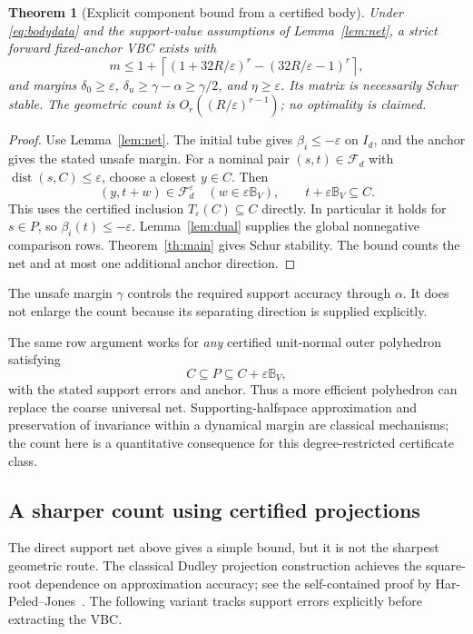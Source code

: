\documentclass[journal,10pt]{IEEEtran}
\newtheorem{theorem}{Theorem}
\theoremstyle{definition}\newtheorem{definition}{Definition}
\theoremstyle{remark}
\newcommand{\dist}{\operatorname{dist}}
\newcommand{\ball}{\mathbb B_V}
\newcommand{\F}{\mathcal F_d}
\begin{document}
\begin{theorem}[Explicit component bound from a certified body]\label{th:count}
Under \eqref{eq:bodydata} and the support-value assumptions of Lemma~\ref{lem:net}, a strict forward fixed-anchor VBC exists with
\begin{equation}\label{eq:mcount}
 m\leq 1+\left\lceil
 (1+32R/\varepsilon)^r-(32R/\varepsilon-1)^r
 \right\rceil,
\end{equation}
and margins $\delta_0\geq\varepsilon$, $\delta_u\geq\gamma-\alpha\geq\gamma/2$, and $\eta\geq\varepsilon$. Its matrix is necessarily Schur stable. The geometric count is $O_r((R/\varepsilon)^{r-1})$; no optimality is claimed.
\end{theorem}
\begin{proof}
Use Lemma~\ref{lem:net}. The initial tube gives $\beta_i\leq-\varepsilon$ on $I_d$, and the anchor gives the stated unsafe margin. For a nominal pair $(s,t)\in\F$ with $\dist(s,C)\leq\varepsilon$, choose a closest $y\in C$. Then
\[
 (y,t+w)\in\mathcal F_d^\varepsilon\quad(w\in\varepsilon\ball),
 \qquad t+\varepsilon\ball\subseteq C.
\]
This uses the certified inclusion $T_\varepsilon(C)\subseteq C$ directly. In particular it holds for $s\in P$, so $\beta_i(t)\leq-\varepsilon$. Lemma~\ref{lem:dual} supplies the global nonnegative comparison rows. Theorem~\ref{th:main} gives Schur stability. The bound counts the net and at most one additional anchor direction.
\end{proof}
The unsafe margin $\gamma$ controls the required support accuracy through $\alpha$. It does not enlarge the count because its separating direction is supplied explicitly.

The same row argument works for \emph{any} certified unit-normal outer polyhedron satisfying
\begin{equation}\label{eq:otherpoly}
 C\subseteq P\subseteq C+\varepsilon\ball,
\end{equation}
with the stated support errors and anchor. Thus a more efficient polyhedron can replace the coarse universal net. Supporting-halfspace approximation and preservation of invariance within a dynamical margin are classical mechanisms; the count here is a quantitative consequence for this degree-restricted certificate class.

\subsection{A sharper count using certified projections}
The direct support net above gives a simple bound, but it is not the sharpest geometric route. The classical Dudley projection construction achieves the square-root dependence on approximation accuracy; see the self-contained proof by Har-Peled--Jones~\cite{harpeled}. The following variant tracks support errors explicitly before extracting the VBC.
\end{document}
